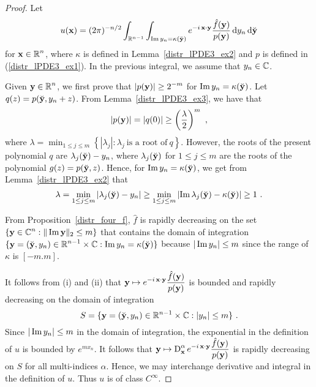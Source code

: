 \begin{proof}
Let
\[
u(\mathbf{x}) = (2\pi)^{-n/2} \int_{\mathbb{R}^{n-1}}
\int_{\operatorname{Im} y_n = \kappa(\breve{\mathbf{y}})}
e^{-i\, \mathbf{x}\cdot\mathbf{y}}
\frac{\hat{f}(\mathbf{y})}{p(\mathbf{y})} \,\mathrm{d}{y_n}\,\mathrm{d}{\breve{\mathbf{y}}}
\]
for $\displaystyle \mathbf{x} \in \mathbb{R}^n$, where $\kappa$ is defined in
Lemma~\ref{distr_lPDE3_ex2} and $p$ is defined in
(\ref{distr_lPDE3_ex1}).  In the previous integral, we
assume that $y_n \in \mathbb{C}$.

 Given $\displaystyle \mathbf{y} \in \mathbb{R}^n$, we first prove that
$\displaystyle |p(\mathbf{y})| \geq 2^{-m}$ for
$\operatorname{Im} y_n = \kappa(\breve{\mathbf{y}})$.
Let $q(z) = p(\breve{\mathbf{y}}, y_n+z)$.
From Lemma~\ref{distr_lPDE3_ex3}, we have that
\[
\left| p(\mathbf{y}) \right| = \left| q(0) \right| \geq
\left(\frac{\lambda}{2}\right)^m \ ,
\]
where
$\displaystyle
\lambda = \min_{1\leq j\leq m} \left\{ \left|\lambda_j\right| : \lambda_j
\ \text{is a root of} \ q \right\}$.
However, the roots of the present polynomial $q$ are
$\lambda_j(\breve{\mathbf{y}}) - y_n$, where $\lambda_j(\breve{\mathbf{y}})$ for
$1\leq j \leq m$ are the roots of the polynomial
$\displaystyle g(z) = p(\breve{\mathbf{y}}, z)$. Hence,
for $\operatorname{Im} y_n = \kappa(\breve{\mathbf{y}})$, we get from
Lemma~\ref{distr_lPDE3_ex2} that
\[
\lambda = \min_{1\leq j \leq m}
\left| \lambda_j(\breve{\mathbf{y}}) - y_n \right|
\geq \min_{1\leq j \leq m}
\left|\operatorname{Im} \lambda_j(\breve{\mathbf{y}}) - \kappa(\breve{\mathbf{y}}) \right|
\geq 1 \ .
\]

From Proposition~\ref{distr_four_f}, $\hat{f}$ is rapidly decreasing
on the set $\displaystyle \{\mathbf{y} \in \mathbb{C}^n : \|\operatorname{Im} \mathbf{y}\|_2 \leq m \}$
that contains the domain of integration
$\displaystyle \{ \mathbf{y} = (\breve{\mathbf{y}}, y_n) \in \mathbb{R}^{n-1}\times \mathbb{C} :
\operatorname{Im} y_n = \kappa(\breve{\mathbf{y}}) \}$ because
$|\operatorname{Im} y_n| \leq m$ since the range of $\kappa$ is $[-m.m]$.

It follows from (i) and (ii) that $\displaystyle
\mathbf{y} \mapsto e^{-i\, \mathbf{x}\cdot\mathbf{y}} \frac{\hat{f}(\mathbf{y})}{p(\mathbf{y})}$
is bounded and rapidly decreasing on the domain of integration
\[
S = \{\mathbf{y} = (\breve{\mathbf{y}}, y_n) \in \mathbb{R}^{n-1}\times \mathbb{C} :
|y_n| \leq m \} \ .
\]
Since $|\operatorname{Im} y_n|\leq m$ in the domain of integration, the
exponential in the definition of $u$ is bounded by $\displaystyle e^{m x_n}$.
It follows that
$\displaystyle \mathbf{y} \mapsto \operatorname{D}_{\mathbf{x}}^\alpha
e^{-i\, \mathbf{x}\cdot\mathbf{y}} \frac{\hat{f}(\mathbf{y})}{p(\mathbf{y})}$
is rapidly decreasing on $S$ for all multi-indices $\alpha$.
Hence, we may interchange derivative and integral in the definition of
$u$.  Thus $u$ is of class $\displaystyle C^\infty$.


\end{proof}
